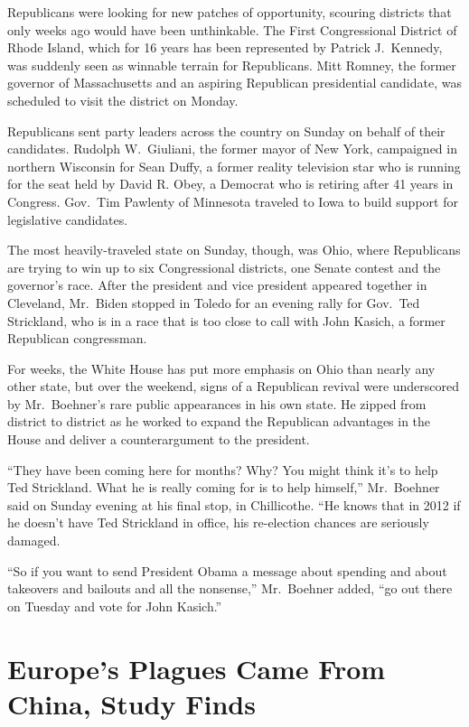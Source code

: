 ﻿\documentclass[12pt]{article}
\begin{document}
Republicans were looking for new patches of opportunity, scouring districts that only weeks ago
would have been unthinkable. The First Congressional District of Rhode Island, which for 16 years
has been represented by Patrick J.~Kennedy, was suddenly seen as winnable terrain for Republicans.
Mitt Romney, the former governor of Massachusetts and an aspiring Republican presidential candidate,
was scheduled to visit the district on Monday.

Republicans sent party leaders across the country on Sunday on behalf of their candidates. Rudolph
W.~Giuliani, the former mayor of New York, campaigned in northern Wisconsin for Sean Duffy, a former
reality television star who is running for the seat held by David R. Obey, a Democrat who is
retiring after 41 years in Congress. Gov.~Tim Pawlenty of Minnesota traveled to Iowa to build
support for legislative candidates.

The most heavily-traveled state on Sunday, though, was Ohio, where Republicans are trying to win up
to six Congressional districts, one Senate contest and the governor's race. After the president and
vice president appeared together in Cleveland, Mr.~Biden stopped in Toledo for an evening rally for
Gov.~Ted Strickland, who is in a race that is too close to call with John Kasich, a former
Republican congressman.

For weeks, the White House has put more emphasis on Ohio than nearly any other state, but over the
weekend, signs of a Republican revival were underscored by Mr.~Boehner's rare public appearances in
his own state. He zipped from district to district as he worked to expand the Republican advantages
in the House and deliver a counterargument to the president.

``They have been coming here for months? Why? You might think it's to help Ted Strickland. What he
is really coming for is to help himself,'' Mr.~Boehner said on Sunday evening at his final stop, in
Chillicothe. ``He knows that in 2012 if he doesn't have Ted Strickland in office, his re-election
chances are seriously damaged.

``So if you want to send President Obama a message about spending and about takeovers and bailouts
and all the nonsense,'' Mr.~Boehner added, ``go out there on Tuesday and vote for John Kasich.''


\section{Europe's Plagues Came From China, Study Finds}
\end{document}
